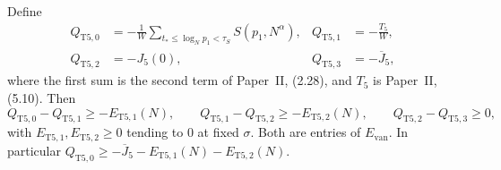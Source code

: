 \begin{lemma}\label{lem:retB-S5top}
Define
\[
\begin{aligned}
 Q_{\mathrm{T5},0}&=-\frac1W\sum_{t_*\le\log_Np_1<\tau_S}S(p_1,N^\alpha),&
 Q_{\mathrm{T5},1}&=-\frac{T_5}W,\\
 Q_{\mathrm{T5},2}&=-J_5(0),&
 Q_{\mathrm{T5},3}&=-\overline J_5,
\end{aligned}
\]
where the first sum is the second term of Paper~II, (2.28), and $T_5$ is
Paper~II, (5.10). Then
\[
 Q_{\mathrm{T5},0}-Q_{\mathrm{T5},1}\ge-E_{\mathrm{T5},1}(N),\qquad
 Q_{\mathrm{T5},1}-Q_{\mathrm{T5},2}\ge-E_{\mathrm{T5},2}(N),\qquad
 Q_{\mathrm{T5},2}-Q_{\mathrm{T5},3}\ge0,
\]
with $E_{\mathrm{T5},1},E_{\mathrm{T5},2}\ge0$ tending to $0$ at fixed
$\sigma$. Both are entries of $E_{\mathrm{van}}$. In particular
$Q_{\mathrm{T5},0}\ge-\overline J_5-E_{\mathrm{T5},1}(N)-E_{\mathrm{T5},2}(N)$.
\end{lemma}

